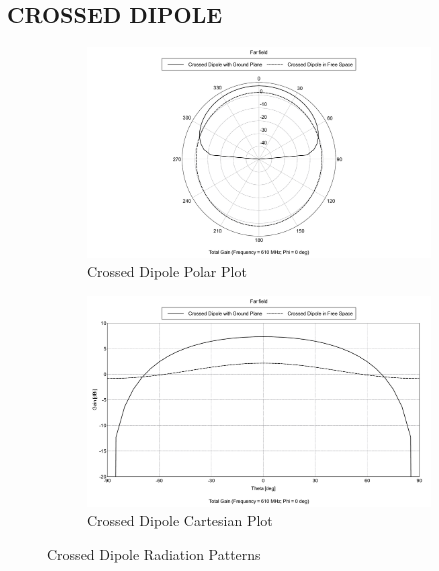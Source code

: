 \documentclass[11pt]{witseiepaper}
\begin{document}
\begin{bibunit}[witseie]
\section{CROSSED DIPOLE} \label{sec:Crossed-Dipole}
\begin{figure}[htb]
    \centering
    \begin{subfigure}{.5\textwidth}
        \centering
            \includegraphics[width=0.9\linewidth]{Crossed-Dipole-Polar.pdf}
            \caption{Crossed Dipole Polar Plot}
            \label{fig:Crossed-Dipole-Radiation-Patterns-Polar}
        \end{subfigure}%
        \begin{subfigure}{.5\textwidth}
            \centering
            \includegraphics[width=0.9\linewidth]{Crossed-Dipole-Cartesian.pdf}
            \caption{Crossed Dipole Cartesian Plot}
                \label{fig:Crossed-Dipole-Radiation-Patterns-Cartesian}
            \end{subfigure}
\caption{Crossed Dipole Radiation Patterns}
\label{fig:Crossed-Dipole-Radiation-Patterns}
\end{figure}





\end{bibunit}
\end{document}
